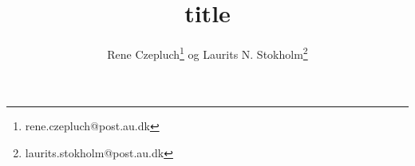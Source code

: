 \documentclass[danish,a4paper,twocolumn, oneside]{memoir}
\title{title}
\author{Rene Czepluch\thanks{rene.czepluch@post.au.dk} og Laurits N. Stokholm\thanks{laurits.stokholm@post.au.dk}}
\date
\begin{document}
\newcommand{\forsogEt}{forsøg 1, afbildning med én samlelinse}
\newcommand{\forsogTo}{forsøg 2, forstørrelsesglas}

\maketitle
\noindent







\end{document}
